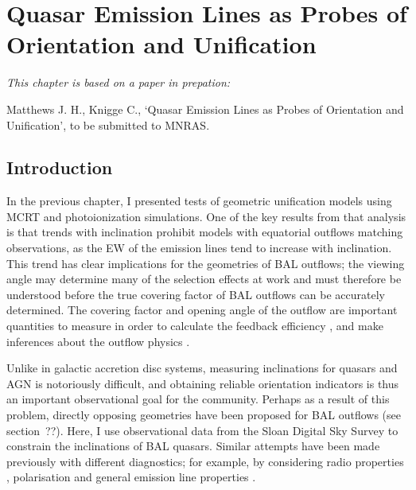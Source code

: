 \chapter{Quasar Emission Lines as Probes of Orientation and Unification}



{\em This chapter is based on a paper in prepation:

Matthews J. H., Knigge C., 
`Quasar Emission Lines as Probes of Orientation and Unification',
to be submitted to MNRAS.}


%
%
\maketitle

\section{Introduction}

In the previous chapter, I presented tests of geometric unification
models using MCRT and photoionization simulations. 
One of the key results from that analysis is that trends with
inclination prohibit models with equatorial outflows matching
observations, as the EW of the emission lines tend
to increase with inclination. This trend has clear implications for
the geometries of BAL outflows; the viewing angle may determine many
of the selection effects at work and must therefore be understood
before the true covering factor of BAL outflows can be accurately 
determined. The covering factor and opening angle of the outflow
are important quantities to measure in order to calculate the
feedback efficiency \citep[e.g.][]{borguet2012}, 
and make inferences about the outflow physics \citep[e.g.][]{proga2005}. 

Unlike in galactic accretion disc systems, measuring inclinations
for quasars and AGN is notoriously difficult, and obtaining 
reliable orientation indicators is thus an important observational
goal for the community. Perhaps as a result of this problem, 
directly opposing geometries have been proposed for 
BAL outflows (see section~??). Here, I use observational 
data from the Sloan Digital Sky Survey to constrain the inclinations
of BAL quasars. Similar attempts have been made previously with
different diagnostics; for example, by considering 
radio properties \citep{zhou2006,dipompeo2012a}, 
polarisation \citep{brotherton2006}
and general emission line properties \citep{dipompeo2012b}.  

